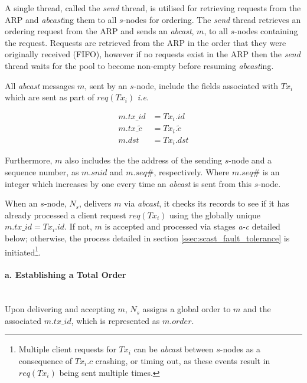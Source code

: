 \begin{enumerate}
        A single thread, called the \emph{send} thread, is utilised for retrieving requests from the ARP and \emph{abcast}ing them to all $s$-nodes for ordering.  The \emph{send} thread retrieves an ordering request from the ARP and sends an \emph{abcast}, $m$, to all $s$-nodes containing the request.  Requests are retrieved from the ARP in the order that they were originally received (FIFO), however if no requests exist in the ARP then the \emph{send} thread waits for the pool to become non-empty before resuming \emph{abcast}ing.  
		
		All \emph{abcast} messages $m$, sent by an $s$-node, include the fields associated with $Tx_i$ which are sent as part of $req(Tx_i)$ \emph{i.e.}
		
		\begin{equation*}
			\begin{split}
			    m.tx\_id &= Tx_i.id \\
			    m.tx\_\tilde{c} &= Tx_i.\tilde{c} \\
	           m.dst &= Tx_i.dst
	        \end{split}
		\end{equation*}
		
		Furthermore, $m$ also includes the the address of the sending $s$-node and a sequence number, as $m.snid$ and $m.seq\#$, respectively.  Where $m.seq\#$ is an integer which increases by one every time an \emph{abcast} is sent from this $s$-node.  
		
		When an $s$-node, $N_s$, delivers $m$ via \emph{abcast}, it checks its records to see if it has already processed a client request $req(Tx_i)$ using the globally unique $m.tx\_id = Tx_i.id$.  If not, $m$ is accepted and processed via stages \emph{a-c} detailed below; otherwise, the process detailed in section \ref{ssec:scast_fault_tolerance} is initiated\footnote{Multiple client requests for $Tx_i$ can be \emph{abcast} between $s$-nodes as a consequence of $Tx_i.c$ crashing, or timing out, as these events result in $req(Tx_i)$ being sent multiple times.}.  
		
        \paragraph{a. Establishing a Total Order} \hfill \\
		Upon delivering and accepting $m$, $N_s$ assigns a global order to $m$ and the associated $m.tx\_id$, which is represented as $m.order$.  
        

\end{enumerate}
